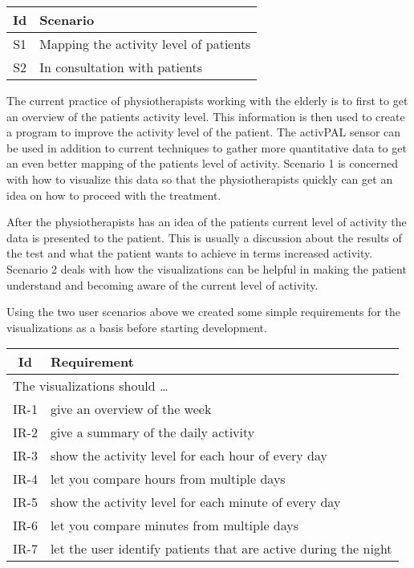 \begin{table}[!h]
  \begin{tabular}{|c|l|}
    \hline
    \textbf{Id} & \textbf{Scenario} \\ \hline
    S1 & Mapping the activity level of patients \\ \hline
    S2 & In consultation with patients \\ \hline
  \end{tabular}
\end{table}

The current practice of physiotherapists working with the elderly is to first to get an overview of the patients activity level. This information is then used to create a program to improve the activity level of the patient. The activPAL sensor can be used in addition to current techniques to gather more quantitative data to get an even better mapping of the patients level of activity. Scenario 1 is concerned with how to visualize this data so that the physiotherapists quickly can get an idea on how to proceed with the treatment.

After the physiotherapists has an idea of the patients current level of activity the data is presented to the patient. This is usually a discussion about the results of the test and what the patient wants to achieve in terms increased activity. Scenario 2 deals with how the visualizations can be helpful in making the patient understand and becoming aware of the current level of activity.

Using the two user scenarios above we created some simple requirements for the visualizations as a basis before starting development.

\begin{table}[h!]
  \begin{center}
  \begin{tabular}{|c|p{12cm}|}
    \hline
      \textbf{Id} & \textbf{Requirement} \\ \hline
    \multicolumn{2}{|l|}{The visualizations should \ldots} \\ \hline
      IR-1 & give an overview of the week \\ \hline
      IR-2 & give a summary of the daily activity \\ \hline
      IR-3 & show the activity level for each hour of every day \\ \hline
      IR-4 & let you compare hours from multiple days \\ \hline
      IR-5 & show the activity level for each minute of every day \\ \hline
      IR-6 & let you compare minutes from multiple days \\ \hline
      IR-7 & let the user identify patients that are active during the night \\ \hline
  \end{tabular}
  \end{center}
\end{table}
